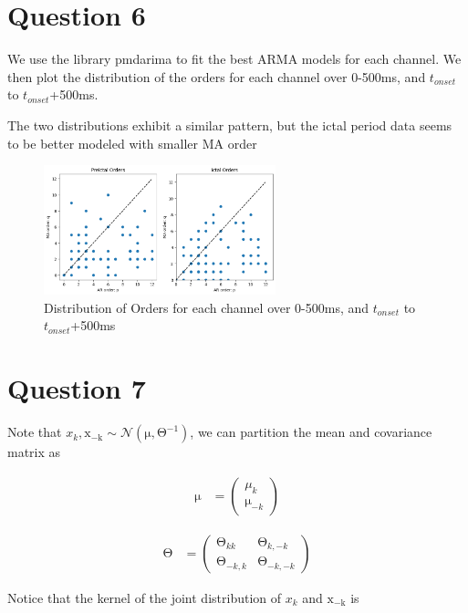 \documentclass{article}
\newcommand{\vect}[1]{\boldsymbol{\mathrm{#1}}}
\begin{document}
\section*{Question 6}

We use the library pmdarima to fit the best ARMA models for each channel. We then plot the distribution of the orders for each channel over 0-500ms, and \(t_{onset}\) to \(t_{onset}\)+500ms. 

The two distributions exhibit a similar pattern, but the ictal period data seems to be better modeled with  smaller MA order

\begin{figure}[h!]
    \centering
    \includegraphics[width=0.6\textwidth]{figs/q6.png}
    \caption{Distribution of Orders for each channel over 0-500ms, and \(t_{onset}\) to \(t_{onset}\)+500ms}
    \label{fig:q6}
\end{figure}
\section*{Question 7}

Note that \(x_k, \vect{x_{-k}} \sim \mathcal{N}(\vect \mu, \vect \Theta^{-1})\), we can partition the mean and covariance matrix as

\begin{align*}
  \vect \mu &= \begin{pmatrix}
    \mu_k \\
    \vect \mu_{-k}
  \end{pmatrix}
\end{align*}

\begin{align*}
  \vect{\Theta} &= \begin{pmatrix}
    \vect \Theta_{kk} & \vect \Theta_{k,-k} \\
    \vect \Theta_{-k,k} & \vect \Theta_{-k,-k}
  \end{pmatrix}
\end{align*}

Notice that the kernel of the joint distribution of \(x_k\) and \(\vect{x_{-k}}\) is
\end{document}
